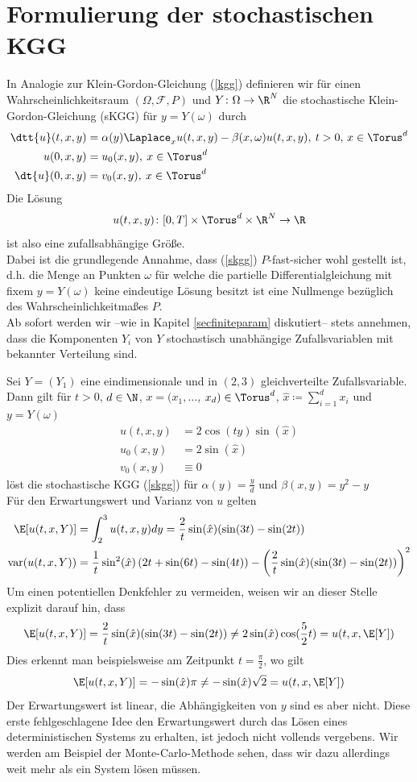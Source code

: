 \section{Formulierung der stochastischen KGG}
In Analogie zur Klein-Gordon-Gleichung (\ref{kgg}) definieren wir für einen Wahrscheinlichkeitsraum $(\Omega,\mathcal{F},P)$ und $Y\colon\Omega\to\R^N$ die stochastische Klein-Gordon-Gleichung (sKGG) für $y=Y(\omega)$ durch
\begin{align}
\label{skgg}
\dtt{u}(t,x,y)&=\alpha(y) \Laplace_x u(t,x,y) - \beta(x,\omega)u(t,x,y), \: t>0, \, x\in \Torus^d\\
u(0,x,y)&=u_0(x,y), \: x\in \Torus^d\\
\dt{u}(0,x,y)&=v_0(x,y), \: x\in \Torus^d
\end{align}
Die Lösung \[u(t,x,y)\colon [0,T]\times\Torus^d\times \R^N\to\R\] ist also eine zufallsabhängige Größe.\\
Dabei ist die grundlegende Annahme, dass (\ref{skgg}) $P$-fast-sicher wohl gestellt ist, d.h. die Menge an Punkten $\omega$ für welche die partielle Differentialgleichung mit fixem $y=Y(\omega)$ keine eindeutige Lösung besitzt ist eine Nullmenge bezüglich des Wahrscheinlichkeitmaßes $P$.\\
Ab sofort werden wir --wie in Kapitel \ref{secfiniteparam} diskutiert-- stets annehmen, dass die Komponenten $Y_i$ von $Y$ stochastisch unabhängige Zufallsvariablen mit bekannter Verteilung sind.
\begin{mathbsp}
\label{bsp:trial1}
Sei $Y=(Y_1)$ eine eindimensionale und in $(2,3)$ gleichverteilte Zufallsvariable. Dann gilt für $t>0$, $d\in\N$, $x=(x_1,\dots$, $x_d)\in\Torus^d$, $\hat{x}\coloneqq \sum_{i=1}^d x_i$ und $y=Y(\omega)$
\begin{align*}
u(t,x,y)&=2\cos(ty)\sin(\hat{x})\\
u_0(x,y)&=2\sin(\hat{x})\\
v_0(x,y)&\equiv 0
\end{align*}
löst die stochastische KGG (\ref{skgg}) für $\alpha(y)=\frac{y}{d}$ und $\beta(x,y)=y^2-y$\\
Für den Erwartungswert und Varianz von $u$ gelten
\begin{align*}
\E[u(t,x,Y)]&=\int_2^3u(t,x,y)dy=\frac{2}{t}\sin(\hat{x})(\sin(3t) - \sin(2t))\\
\text{var}(u(t,x,Y))&=\frac{1}{t}\sin^2(\hat{x})\left(2t + \sin(6t) - \sin(4t)\right)- \left(\frac{2}{t}\sin(\hat{x})(\sin(3t) - \sin(2t))\right)^2
\end{align*}
Um einen potentiellen Denkfehler zu vermeiden, weisen wir an dieser Stelle explizit darauf hin, dass 
\[\E[u(t,x,Y)]=\frac{2}{t}\sin(\hat{x})(\sin(3t) - \sin(2t))\neq 2\sin(\hat{x})\cos(\frac{5}{2}t)=u(t,x,\E[Y])\]
Dies erkennt man beispielsweise am Zeitpunkt $t=\frac{\pi}{2}$, wo gilt
\[\E[u(t,x,Y)]=-\sin(\hat{x})\pi \neq -\sin(\hat{x})\sqrt{2}=u(t,x,\E[Y])\]
Der Erwartungswert ist linear, die Abhängigkeiten von $y$ sind es aber nicht. Diese erste fehlgeschlagene Idee den Erwartungswert durch das Lösen eines deterministischen Systems zu erhalten, ist jedoch nicht vollends vergebens. Wir werden am Beispiel der Monte-Carlo-Methode sehen, dass wir dazu allerdings weit mehr als ein System lösen müssen.
\end{mathbsp}
